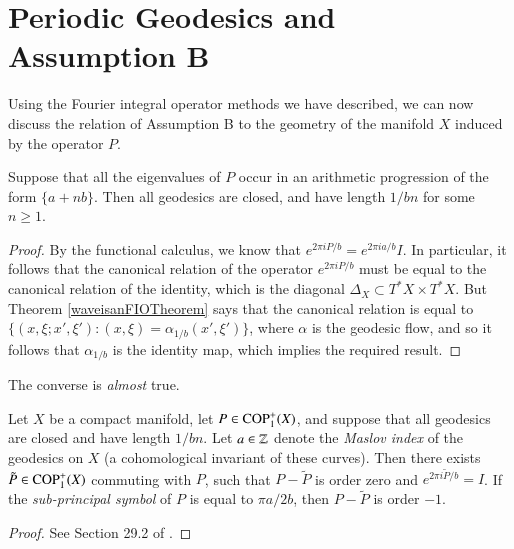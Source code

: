 







\section{Periodic Geodesics and Assumption B} \label{sec:PeriodicGeodesics}

Using the Fourier integral operator methods we have described, we can now discuss the relation of Assumption B to the geometry of the manifold $X$ induced by the operator $P$.

\begin{theorem}
  Suppose that all the eigenvalues of $P$ occur in an arithmetic progression of the form $\{ a + n b \}$. Then all geodesics are closed, and have length $1/bn$ for some $n \geq 1$.
\end{theorem}
\begin{proof}
  By the functional calculus, we know that $e^{2 \pi i P/b} = e^{2 \pi i a/b} I$. In particular, it follows that the canonical relation of the operator $e^{2 \pi i P/b}$ must be equal to the canonical relation of the identity, which is the diagonal $\Delta_X \subset T^* X \times T^* X$. But Theorem \ref{waveisanFIOTheorem} says that the canonical relation is equal to $\{ (x,\xi;x',\xi'): (x,\xi) = \alpha_{1/b}(x',\xi') \}$, where $\alpha$ is the geodesic flow, and so it follows that $\alpha_{1/b}$ is the identity map, which implies the required result.
\end{proof}

The converse is \emph{almost} true.

\begin{theorem}
  Let $X$ be a compact manifold, let $P \in {\text{COP}^{+}_{{1}}}(X)$, and suppose that all geodesics are closed and have length $1/bn$. Let $a \in \operatorname{\mathbb{Z}}$ denote the \emph{Maslov index} of the geodesics  on $X$ (a cohomological invariant of these curves). Then there exists $\tilde{P} \in {\text{COP}^{+}_{{1}}}(X)$ commuting with $P$, such that $P - \tilde{P}$ is order zero and $e^{2 \pi i \tilde{P} / b} = I$. If the \emph{sub-principal symbol} of $P$ is equal to $\pi a / 2 b$, then $P - \tilde{P}$ is order $-1$.
\end{theorem}
\begin{proof}
  See Section 29.2 of \cite{Hormander4}.
\end{proof}

